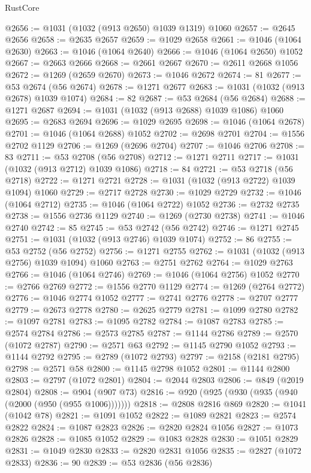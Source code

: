 \begin{lexlean}{RustCore}
\begin{coremodule}
@2656 := @1031 (@1032 (@913 @2650) @1039 @1319) @1060
@2657 := @2645 @2656
@2658 := @2635 @2657
@2659 := @1029 @2658
@2661 := @1046 (@1064 @2630)
@2663 := @1046 (@1064 @2640)
@2666 := @1046 (@1064 @2650) @1052
@2667 := @2663 @2666
@2668 := @2661 @2667
@2670 := @2611 @2668 @1056
@2672 := @1269 (@2659 @2670)
@2673 := @1046 @2672
@2674 := 81
@2677 := @53 @2674 (@56 @2674)
@2678 := @1271 @2677
@2683 := @1031 (@1032 (@913 @2678) @1039 @1074)
@2684 := 82
@2687 := @53 @2684 (@56 @2684)
@2688 := @1271 @2687
@2694 := @1031 (@1032 (@913 @2688) @1039 @1086) @1060
@2695 := @2683 @2694
@2696 := @1029 @2695
@2698 := @1046 (@1064 @2678)
@2701 := @1046 (@1064 @2688) @1052
@2702 := @2698 @2701
@2704 := @1556 @2702 @1129
@2706 := @1269 (@2696 @2704)
@2707 := @1046 @2706
@2708 := 83
@2711 := @53 @2708 (@56 @2708)
@2712 := @1271 @2711
@2717 := @1031 (@1032 (@913 @2712) @1039 @1086)
@2718 := 84
@2721 := @53 @2718 (@56 @2718)
@2722 := @1271 @2721
@2728 := @1031 (@1032 (@913 @2722) @1039 @1094) @1060
@2729 := @2717 @2728
@2730 := @1029 @2729
@2732 := @1046 (@1064 @2712)
@2735 := @1046 (@1064 @2722) @1052
@2736 := @2732 @2735
@2738 := @1556 @2736 @1129
@2740 := @1269 (@2730 @2738)
@2741 := @1046 @2740
@2742 := 85
@2745 := @53 @2742 (@56 @2742)
@2746 := @1271 @2745
@2751 := @1031 (@1032 (@913 @2746) @1039 @1074)
@2752 := 86
@2755 := @53 @2752 (@56 @2752)
@2756 := @1271 @2755
@2762 := @1031 (@1032 (@913 @2756) @1039 @1094) @1060
@2763 := @2751 @2762
@2764 := @1029 @2763
@2766 := @1046 (@1064 @2746)
@2769 := @1046 (@1064 @2756) @1052
@2770 := @2766 @2769
@2772 := @1556 @2770 @1129
@2774 := @1269 (@2764 @2772)
@2776 := @1046 @2774 @1052
@2777 := @2741 @2776
@2778 := @2707 @2777
@2779 := @2673 @2778
@2780 := @2625 @2779
@2781 := @1099 @2780
@2782 := @1097 @2781
@2783 := @1095 @2782
@2784 := @1087 @2783
@2785 := @2574 @2784
@2786 := @2573 @2785
@2787 := @1144 @2786
@2789 := @2570 (@1072 @2787)
@2790 := @2571 @63
@2792 := @1145 @2790 @1052
@2793 := @1144 @2792
@2795 := @2789 (@1072 @2793)
@2797 := @2158 (@2181 @2795)
@2798 := @2571 @58
@2800 := @1145 @2798 @1052
@2801 := @1144 @2800
@2803 := @2797 (@1072 @2801)
@2804 := @2044 @2803
@2806 := @849 (@2019 @2804)
@2808 := @904 (@907 @73)
@2816 := @920 (@925 (@930 (@935 (@940 (@2000 (@950 (@955 @1006)))))))
@2818 := @2808 @2816 @869
@2820 := @1041 (@1042 @78)
@2821 := @1091 @1052
@2822 := @1089 @2821
@2823 := @2574 @2822
@2824 := @1087 @2823
@2826 := @2820 @2824 @1056
@2827 := @1073 @2826
@2828 := @1085 @1052
@2829 := @1083 @2828
@2830 := @1051 @2829
@2831 := @1049 @2830
@2833 := @2820 @2831 @1056
@2835 := @2827 (@1072 @2833)
@2836 := 90
@2839 := @53 @2836 (@56 @2836)

\end{coremodule}
\end{lexlean}

